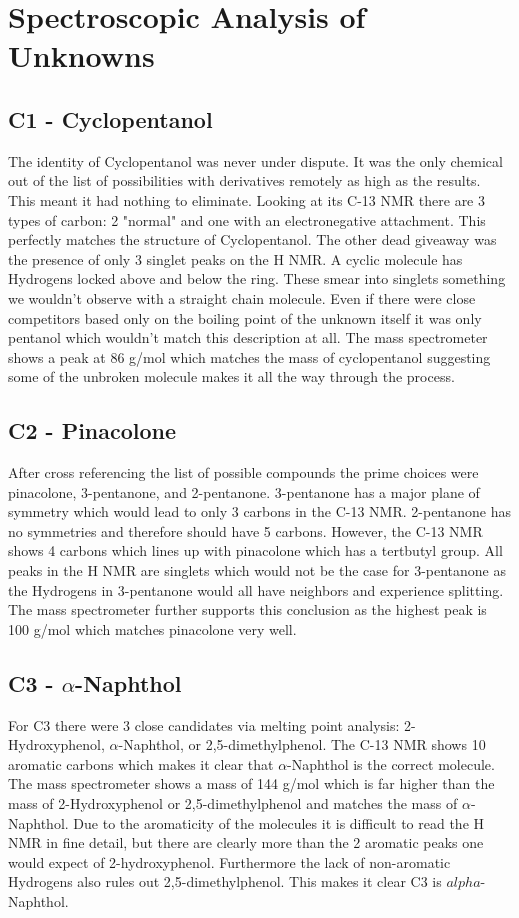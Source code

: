 \documentclass[11pt]{article}
\begin{document}
	\section{Spectroscopic Analysis of Unknowns}
	
	\subsection{C1 - Cyclopentanol}
	The identity of Cyclopentanol was never under dispute. It was the only chemical out of the list of possibilities with derivatives remotely as high as the results. This meant it had nothing to eliminate. Looking at its C-13 NMR there are 3 types of carbon: 2 "normal" and one with an electronegative attachment. This perfectly matches the structure of Cyclopentanol. The other dead giveaway was the presence of only 3 singlet peaks on the H NMR. A cyclic molecule has Hydrogens locked above and below the ring. These smear into singlets something we wouldn't observe with a straight chain molecule. Even if there were close competitors based only on the boiling point of the unknown itself it was only pentanol which wouldn't match this description at all. The mass spectrometer shows a peak at 86 g/mol which matches the mass of cyclopentanol suggesting some of the unbroken molecule makes it all the way through the process.
	
	\subsection{C2 - Pinacolone}
	After cross referencing the list of possible compounds the prime choices were pinacolone, 3-pentanone, and 2-pentanone. 3-pentanone has a major plane of symmetry which would lead to only 3 carbons in the C-13 NMR. 2-pentanone has no symmetries and therefore should have 5 carbons. However, the C-13 NMR shows 4 carbons which lines up with pinacolone which has a tertbutyl group. All peaks in the H NMR are singlets which would not be the case for 3-pentanone as the Hydrogens in 3-pentanone would all have neighbors and experience splitting. The mass spectrometer further supports this conclusion as the highest peak is 100 g/mol which matches pinacolone very well.
	
	\subsection{C3 - $\alpha$-Naphthol}
	For C3 there were 3 close candidates via melting point analysis: 2-Hydroxyphenol, $\alpha$-Naphthol, or 2,5-dimethylphenol. The C-13 NMR shows 10 aromatic carbons which makes it clear that $\alpha$-Naphthol is the correct molecule. The mass spectrometer shows a mass of 144 g/mol which is far higher than the mass of 2-Hydroxyphenol or 2,5-dimethylphenol and matches the mass of $\alpha$-Naphthol. Due to the aromaticity of the molecules it is difficult to read the H NMR in fine detail, but there are clearly more than the 2 aromatic peaks one would expect of 2-hydroxyphenol. Furthermore the lack of non-aromatic Hydrogens also rules out 2,5-dimethylphenol. This makes it clear C3 is $alpha$-Naphthol.
	
\end{document}
